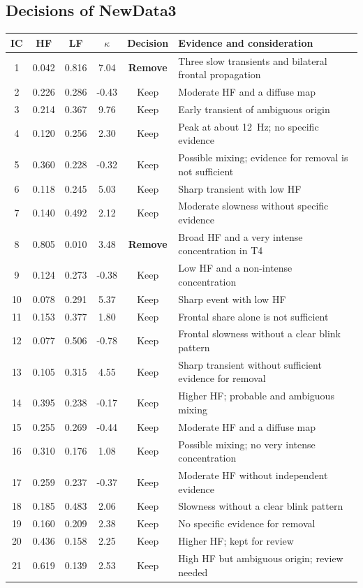 \clearpage
\subsection*{Decisions of NewData3}
\begin{center}
\small
\begin{longtable}{@{}cccccp{6.4cm}@{}}
\toprule
\textbf{IC} & \textbf{HF} & \textbf{LF} & $\kappa$ & \textbf{Decision} & \textbf{Evidence and consideration}\\
\midrule
\endhead
1 & 0.042 & 0.816 & 7.04 & \textcolor{accent}{\textbf{Remove}} & Three slow transients and bilateral frontal propagation\\
2 & 0.226 & 0.286 & -0.43 & Keep & Moderate HF and a diffuse map\\
3 & 0.214 & 0.367 & 9.76 & Keep & Early transient of ambiguous origin\\
4 & 0.120 & 0.256 & 2.30 & Keep & Peak at about 12~Hz; no specific evidence\\
5 & 0.360 & 0.228 & -0.32 & Keep & Possible mixing; evidence for removal is not sufficient\\
6 & 0.118 & 0.245 & 5.03 & Keep & Sharp transient with low HF\\
7 & 0.140 & 0.492 & 2.12 & Keep & Moderate slowness without specific evidence\\
8 & 0.805 & 0.010 & 3.48 & \textcolor{accent}{\textbf{Remove}} & Broad HF and a very intense concentration in T4\\
9 & 0.124 & 0.273 & -0.38 & Keep & Low HF and a non-intense concentration\\
10 & 0.078 & 0.291 & 5.37 & Keep & Sharp event with low HF\\
11 & 0.153 & 0.377 & 1.80 & Keep & Frontal share alone is not sufficient\\
12 & 0.077 & 0.506 & -0.78 & Keep & Frontal slowness without a clear blink pattern\\
13 & 0.105 & 0.315 & 4.55 & Keep & Sharp transient without sufficient evidence for removal\\
14 & 0.395 & 0.238 & -0.17 & Keep & Higher HF; probable and ambiguous mixing\\
15 & 0.255 & 0.269 & -0.44 & Keep & Moderate HF and a diffuse map\\
16 & 0.310 & 0.176 & 1.08 & Keep & Possible mixing; no very intense concentration\\
17 & 0.259 & 0.237 & -0.37 & Keep & Moderate HF without independent evidence\\
18 & 0.185 & 0.483 & 2.06 & Keep & Slowness without a clear blink pattern\\
19 & 0.160 & 0.209 & 2.38 & Keep & No specific evidence for removal\\
20 & 0.436 & 0.158 & 2.25 & Keep & Higher HF; kept for review\\
21 & 0.619 & 0.139 & 2.53 & Keep & High HF but ambiguous origin; review needed\\
\bottomrule
\end{longtable}
\end{center}

